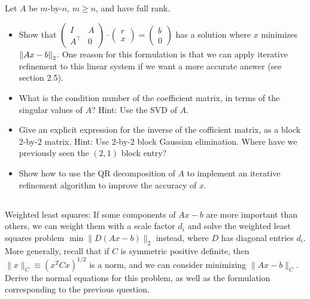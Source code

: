 \documentclass[a4paper]{ctexart}
\newcommand{\pf}{\textbf{\color{pink}{proof:}}}
\begin{document}
\subsection{}
Let $A$ be $m$-by-$n$, $m \ge n$, and have full rank.
\begin{itemize}
    \item Show that $\begin{pmatrix}
        I&A\\
        A^\top&0
    \end{pmatrix}\cdot\begin{pmatrix}
        r\\x
    \end{pmatrix} = \begin{pmatrix}
        b\\0
    \end{pmatrix}$ has a solution where $x$
    minimizes $\norm{Ax - b}_2$. One reason for this formulation is that we can
    apply iterative reﬁnement to this linear system if we want a more accurate
    answer (see section 2.5).
    \item What is the condition number of the coeﬃcient matrix, in
    terms of the singular values of $A$? Hint: Use the SVD of $A$.
    \item Give an explicit expression for the inverse of the cofficient
    matrix, as a block $2$-by-$2$ matrix. Hint: Use $2$-by-$2$ block Gaussian elimination. Where have we previously seen the $(2,1)$ block entry?
    \item Show how to use the QR decomposition of $A$ to implement an
    iterative reﬁnement algorithm to improve the accuracy of $x$.
\end{itemize}

\pf

\subsection{}
Weighted least squares: If some components of $Ax-b$ 
are more important than others, we can weight them with a scale factor $d_i$ 
and solve the weighted least squares problem $\min \|D(A x-b)\|_2$ instead, 
where $D$ has diagonal entries $d_i$. More generally, recall that if $C$ is 
symmetric positive definite, then $\|x\|_C \equiv\left(x^T C x\right)^{1/2}$ 
is a norm, and we can consider minimizing $\|A x-b\|_C$. Derive the normal 
equations for this problem, 
as well as the formulation corresponding to the previous question.

\pf
\end{document}
